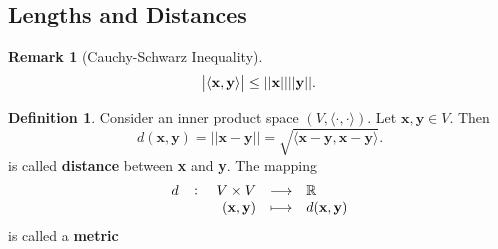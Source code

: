 \documentclass[12pt,openany]{book}
\theoremstyle{definition}
\newtheorem{definition}{Definition}[chapter]
\newtheorem{remark}{Remark}[chapter]
\newcommand{\R}{\mathbb{R}}
\newcommand{\inner}[1]{\langle #1\rangle}
\newcommand{\norms}[1]{|| #1||}
\begin{document}
	\subsection{Lengths and Distances}
	\begin{remark}[Cauchy-Schwarz Inequality]
		\[
		\abs{\inner{\textbf{x},\textbf{y}}}\leq\norms{\textbf{x}}\norms{\textbf{y}}.
		\]
	\end{remark}
	
	\begin{tcolorbox}[colframe=defcolor,title={\color{white}\bf Distance and Metric}]
		\begin{definition}
			Consider an inner product space \((V,\inner{\cdot,\cdot})\). Let \(\textbf{x},\textbf{y}\in V\). Then \[
			d(\textbf{x},\textbf{y})=\norms{\textbf{x}-\textbf{y}}=\sqrt{\inner{\textbf{x}-\textbf{y},\textbf{x}-\textbf{y}}}.
			\] is called \textbf{distance} between \textbf{x} and \textbf{y}. The mapping \[
			\fullfunction{d}{V\times V}{\R}{(\textbf{x},\textbf{y})}{d(\textbf{x},\textbf{y})}
			\] is called a \textbf{metric}
		\end{definition}
	\end{tcolorbox}
\end{document}
